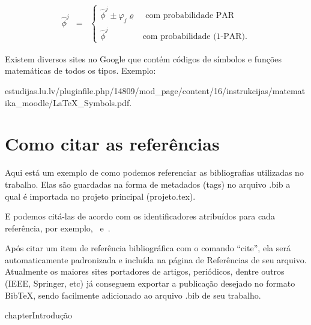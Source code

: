 \begin{eqnarray}
\label{eq:par}
\hat{\phi}^j & = & \left\{ \begin{array}{ll} \hat{\phi}^j\pm \varphi_j \varrho  & \mbox{{ com probabilidade PAR}} \\
    \hat{\phi}^j & \mbox{{com probabilidade (1-PAR).}}
\end{array}\right.
\end{eqnarray}

Existem diversos sites no Google que contém códigos de símbolos e funções matemáticas de todos os tipos. Exemplo:\\
\begin{center}
\tiny estudijas.lu.lv/pluginfile.php/14809/mod\_page/content/16/instrukcijas/matematika\_moodle/LaTeX\_Symbols.pdf.
\end{center}

\section{Como citar as referências}
\label{ss.referencias}

Aqui está um exemplo de como podemos referenciar as bibliografias utilizadas no trabalho. Elas são guardadas na forma de metadados (tags) no arquivo .bib a qual é importada no projeto principal (projeto.tex).

E podemos citá-las de acordo com os identificadores atribuídos para cada referência, por exemplo,~\cite{stonebraker93} e~\cite{rocha09}.

Após citar um item de referência bibliográfica com o comando ``cite'', ela será automaticamente padronizada e incluída na página de Referências de seu arquivo. Atualmente os maiores sites portadores de artigos, periódicos, dentre outros (IEEE, Springer, etc) já conseguem exportar a publicação desejado no formato BibTeX, sendo facilmente adicionado ao arquivo .bib de seu trabalho.


chapter{Introdução}
\label{c.introducao}

